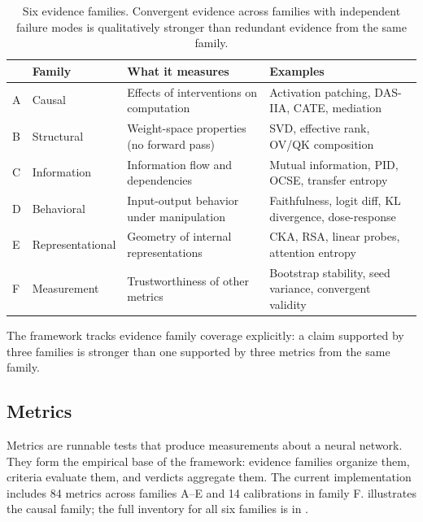 \documentclass[10pt]{article}
\begin{document}
\begin{table}[H]
\centering
\small
\caption{Six evidence families. Convergent evidence across families with independent failure modes is qualitatively stronger than redundant evidence from the same family.}
\label{tab:families}
\renewcommand{\arraystretch}{1.2}
\begin{tabular}{@{}ll>{\raggedright\arraybackslash}p{4.5cm}>{\raggedright\arraybackslash}p{5cm}@{}}
\toprule
& \textbf{Family} & \textbf{What it measures} & \textbf{Examples} \\
\midrule
A & Causal & Effects of interventions on computation & Activation patching, DAS-IIA, CATE, mediation \\
\midrule
B & Structural & Weight-space properties (no forward pass) & SVD, effective rank, OV/QK composition \\
\midrule
C & Information & Information flow and dependencies & Mutual information, PID, OCSE, transfer entropy \\
\midrule
D & Behavioral & Input-output behavior under manipulation & Faithfulness, logit diff, KL divergence, dose-response \\
\midrule
E & Representational & Geometry of internal representations & CKA, RSA, linear probes, attention entropy \\
\midrule
F & Measurement & Trustworthiness of other metrics & Bootstrap stability, seed variance, convergent validity \\
\bottomrule
\end{tabular}
\end{table}

The framework tracks evidence family coverage explicitly: a claim supported by three families is stronger than one supported by three metrics from the same family.

\subsection{Metrics}
\label{sec:metrics}

Metrics are runnable tests that produce measurements about a neural network. They form the empirical base of the framework: evidence families organize them, criteria evaluate them, and verdicts aggregate them. The current implementation includes 84 metrics across families A--E and 14 calibrations in family F.  illustrates the causal family; the full inventory for all six families is in .
\end{document}
